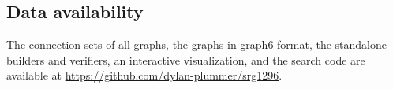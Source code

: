\documentclass[11pt]{amsart}
\theoremstyle{definition}
\begin{document}
\subsection*{Data availability}
The connection sets of all graphs, the graphs in graph6 format, the standalone builders and verifiers, an interactive visualization, and the search code are available at \url{https://github.com/dylan-plummer/srg1296}.

{\small
\setlength{\bibsep}{0pt plus 1pt}


}
\end{document}
